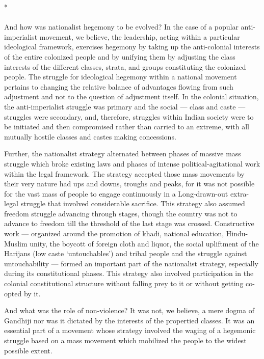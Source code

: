 \begin{center}*\end{center}

\paragraph*{}
And how was nationalist hegemony to be evolved? In the case of a popular anti-imperialist movement, we believe, the leadership, acting within a particular ideological framework, exercises hegemony by taking up the anti-colonial interests of the entire colonized people and by unifying them by adjusting the class interests of the different classes, strata, and groups constituting the colonized people. The struggle for ideological hegemony within a national movement pertains to changing the relative balance of advantages flowing from such adjustment and not to the question of adjustment itself. In the colonial situation, the anti-imperialist struggle was primary and the social — class and caste — struggles were secondary, and, therefore, struggles within Indian society were to be initiated and then compromised rather than carried to an extreme, with all mutually hostile classes and castes making concessions.

Further, the nationalist strategy alternated between phases of massive mass struggle which broke existing laws and phases of intense political-agitational work within the legal framework. The strategy accepted those mass movements by their very nature had ups and downs, troughs and peaks, for it was not possible for the vast mass of people to engage continuously in a Long-drawn-out extra-legal struggle that involved considerable sacrifice. This strategy also assumed freedom struggle advancing through stages, though the country was not to advance to freedom till the threshold of the last stage was crossed. Constructive work — organized around the promotion of khadi, national education, Hindu-Muslim unity, the boycott of foreign cloth and liquor, the social upliftment of the Harijans (low caste `untouchables') and tribal people and the struggle against untouchability — formed an important part of the nationalist strategy, especially during its constitutional phases. This strategy also involved participation in the colonial constitutional structure without falling prey to it or without getting co-opted by it.

And what was the role of non-violence? It was not, we believe, a mere dogma of Gandhiji nor was it dictated by the interests of the propertied classes. It was an essential part of a movement whose strategy involved the waging of a hegemonic struggle based on a mass movement which mobilized the people to the widest possible extent.

